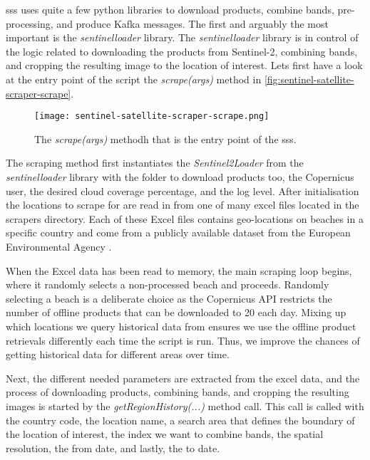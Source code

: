 \acrshort{sss} uses quite a few python libraries to download products, combine bands, pre-processing, and produce Kafka messages. The first and arguably the most important is the \emph{sentinelloader} library. The \emph{sentinelloader} library is in control of the logic related to downloading the products from Sentinel-2, combining bands, and cropping the resulting image to the location of interest. Lets first have a look at the entry point of the script the \emph{scrape(args)} method in \autoref{fig:sentinel-satellite-scraper-scrape}.

\begin{figure}[h!]
    \centering
    \texttt{[image: sentinel-satellite-scraper-scrape.png]}
    \caption{The \emph{scrape(args)} methodh that is the entry point of the \acrshort{sss}.}
    \label{fig:sentinel-satellite-scraper-scrape}
\end{figure}

The scraping method first instantiates the \emph{Sentinel2Loader} from the \emph{sentinelloader} library with the folder to download products too, the Copernicus user, the desired cloud coverage percentage, and the log level. After initialisation the locations to scrape for are read in from one of many excel files located in the scrapers directory. Each of these Excel files contains geo-locations on beaches in a specific country and come from a publicly available dataset from the European Environmental Agency \cite{bathing_dateset}. 

When the Excel data has been read to memory, the main scraping loop begins, where it randomly selects a non-processed beach and proceeds. Randomly selecting a beach is a deliberate choice as the Copernicus API restricts the number of offline products that can be downloaded to 20 each day. Mixing up which locations we query historical data from ensures we use the offline product retrievals differently each time the script is run. Thus, we improve the chances of getting historical data for different areas over time.

Next, the different needed parameters are extracted from the excel data, and the process of downloading products, combining bands, and cropping the resulting images is started by the \emph{getRegionHistory(...)} method call. This call is called with the country code, the location name, a search area that defines the boundary of the location of interest, the index we want to combine bands, the spatial resolution, the from date, and lastly, the to date.

